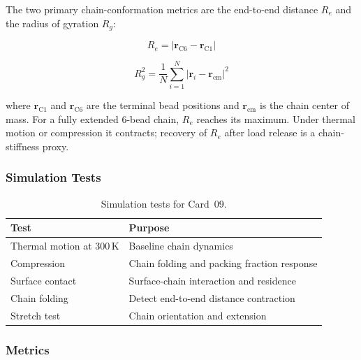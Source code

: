 \documentclass[12pt]{article}
\begin{document}
The two primary chain-conformation metrics are the end-to-end distance
$R_e$ and the radius of gyration $R_g$:

\begin{equation}
	R_e = \left| \mathbf{r}_{\mathrm{C6}} - \mathbf{r}_{\mathrm{C1}} \right|
	\label{eq:hexene_re}
\end{equation}

\begin{equation}
	R_g^2 = \frac{1}{N} \sum_{i=1}^{N} \left| \mathbf{r}_i - \mathbf{r}_{\mathrm{cm}} \right|^2
	\label{eq:hexene_rg}
\end{equation}

\noindent where $\mathbf{r}_{\mathrm{C1}}$ and $\mathbf{r}_{\mathrm{C6}}$
are the terminal bead positions and $\mathbf{r}_{\mathrm{cm}}$ is the
chain center of mass.
For a fully extended 6-bead chain, $R_e$ reaches its maximum.
Under thermal motion or compression it contracts; recovery of $R_e$
after load release is a chain-stiffness proxy.

\subsubsection*{Simulation Tests}

\begin{table}[H]
\centering
\caption{Simulation tests for Card~09.}
\label{tab:hexene_tests}
\begin{tabular}{ll}
\toprule
\textbf{Test} & \textbf{Purpose} \\
\midrule
Thermal motion at 300\,K    & Baseline chain dynamics \\
Compression                 & Chain folding and packing fraction response \\
Surface contact             & Surface-chain interaction and residence \\
Chain folding               & Detect end-to-end distance contraction \\
Stretch test                & Chain orientation and extension \\
\bottomrule
\end{tabular}
\end{table}

\subsubsection*{Metrics}
\end{document}
